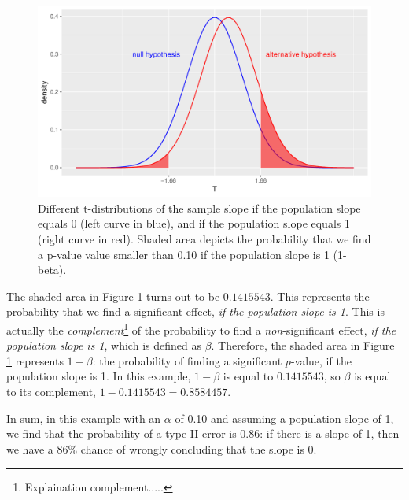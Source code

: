 \documentclass[]{report}\usepackage[]{graphicx}\usepackage[]{color}
\makeatletter
\def\maxwidth{ %
  \ifdim\Gin@nat@width>\linewidth
    \linewidth
  \else
    \Gin@nat@width
  \fi
}
\newenvironment{knitrout}{}{} %
\makeatother
\begin{document}
\begin{knitrout}
\color{fgcolor}\begin{figure}

{\centering \includegraphics[width=\maxwidth]{figure/inf_21-1} 

}

\caption[Different t-distributions of the sample slope if the population slope equals 0 (left curve in blue), and if the population slope equals 1 (right curve in red)]{Different t-distributions of the sample slope if the population slope equals 0 (left curve in blue), and if the population slope equals 1 (right curve in red). Shaded area depicts the probability that we find a p-value value smaller than 0.10 if the population slope is 1 (1-beta).}\label{fig:inf_21}
\end{figure}


\end{knitrout}

The shaded area in Figure \ref{fig:inf_21} turns out to be $0.1415543$. This represents the probability that we find a significant effect, \textit{if the population slope is 1}. This is actually the \textit{complement}\footnote{Explaination complement.....} of the probability to find a \textit{non}-significant effect, \textit{if the population slope is 1}, which is defined as $\beta$. Therefore, the shaded area in Figure \ref{fig:inf_21} represents $1- \beta$: the probability of finding a significant $p$-value, if the population slope is 1. In this example, $1-\beta$ is equal to $0.1415543$, so $\beta$ is equal to its complement, $1- 0.1415543 = 0.8584457$.

In sum, in this example with an $\alpha$ of 0.10 and assuming a population slope of 1, we find that the probability of a type II error is 0.86: if there is a slope of 1, then we have a 86\% chance of wrongly concluding that the slope is 0.
\end{document}
